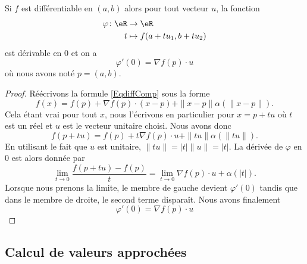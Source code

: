 \begin{proposition}
	Si \( f\) est différentiable en \( (a,b)\) alors pour tout vecteur \( u\), la fonction
	\begin{equation}
		\begin{aligned}
			\varphi\colon \eR & \to \eR                    \\
			t                 & \mapsto   f(a+tu_1,b+tu_2)
		\end{aligned}
	\end{equation}
	est dérivable en \( 0\) et on a
	\begin{equation}
		\varphi'(0)=\nabla f(p)\cdot u
	\end{equation}
	où nous avons noté \( p=(a,b)\).
\end{proposition}

\begin{proof}
	Réécrivons la formule \eqref{EqdiffComp} sous la forme
	\begin{equation}
		f(x)=f(p)+\nabla f(p)\cdot (x-p)+\| x-p \|\alpha(\| x-p \|).
	\end{equation}
	Cela étant vrai pour tout \( x\), nous l'écrivons en particulier pour \( x=p+tu\) où \( t\) est un réel et \( u\) est le vecteur unitaire choisi. Nous avons donc
	\begin{equation}
		f(p+tu)=f(p)+t\nabla f(p)\cdot u+\| tu \|\alpha(\| tu \|).
	\end{equation}
	En utilisant le fait que \( u\) est unitaire, \( \| tu \|=| t |\| u \|=| t |\). La dérivée de \( \varphi\) en \( 0\) est alors donnée par
	\begin{equation}
		\lim_{t\to 0} \frac{ f(p+tu)-f(p) }{ t }=\lim_{t\to 0} \nabla f(p)\cdot u+\alpha(| t |).
	\end{equation}
	Lorsque nous prenons la limite, le membre de gauche devient \( \varphi'(0)\) tandis que dans le membre de droite, le second terme disparaît. Nous avons finalement
	\begin{equation}
		\varphi'(0)=\nabla f(p)\cdot u
	\end{equation}
\end{proof}

\subsection{Calcul de valeurs approchées}

